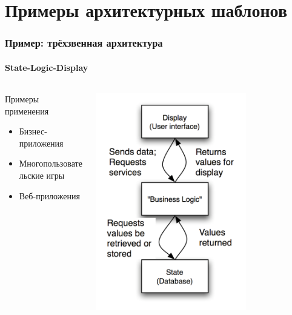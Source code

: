 \documentclass{../../slides-style}
\begin{document}
    \section{Примеры архитектурных шаблонов}

    \begin{frame}
        \frametitle{Пример: трёхзвенная архитектура}
        \framesubtitle{State-Logic-Display}
        \begin{columns}
            \begin{column}{0.5\textwidth}
                Примеры применения
                \begin{itemize}
                    \item Бизнес-приложения
                    \item Многопользовательские игры
                    \item Веб-приложения
                \end{itemize}
            \end{column}
            \begin{column}{0.5\textwidth}
                \begin{center}
                    \includegraphics[width=0.7\textwidth]{threeTieredArchitecture.png}
                \end{center}
            \end{column}
        \end{columns}
    \end{frame}
\end{document}
